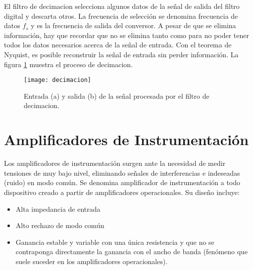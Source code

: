 El filtro de decimacion selecciona algunos datos de la señal de salida del filtro digital y descarta otros. La frecuencia de selección se denomina frecuencia de datos $f_s$ y es la frecuencia de salida del conversor. A pesar de que se elimina información, hay que recordar que no se elimina tanto como para no poder tener todos los datos necesarios acerca de la señal de entrada. Con el teorema de Nyquist\cite{shannon}, es posible reconstruir la señal de entrada sin perder información. La figura \ref{fig:decimacion} muestra el proceso de decimacion.\cite{delta_sigma_2} %

\begin{figure}[h]
  \centering
  \texttt{[image: decimacion]}
  \caption{Entrada (a) y salida (b) de la señal procesada por el filtro de decimacion. }\label{fig:decimacion}
\end{figure} 




\section{Amplificadores de Instrumentación} %
\label{sec:amplificadores_de_instrumentacion}


Los amplificadores de instrumentación surgen ante la necesidad de medir tensiones de muy bajo nivel, eliminando señales de interferencias e indeseadas (ruido) en modo común.
Se denomina amplificador de instrumentación a todo dispositivo creado a partir de amplificadores operacionales. Su diseño incluye:

\begin{itemize}
  \item Alta impedancia de entrada
    \item Alto rechazo de modo común
    \item Ganancia estable y variable con una única resistencia y que no se contraponga directamente la ganancia con el ancho de banda (fenómeno que suele suceder en los amplificadores operacionales).
\end{itemize}

